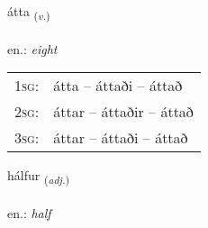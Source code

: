 \documentclass[frontgrid, backgrid]{flacards}\usepackage[]{graphicx}\usepackage[]{xcolor}
\begin{document}
\renewcommand{\flhead}{\vskip5pt \fboxsep=0pt {\small\bfseries\footnotesize Sagnorð | Verb}}
\renewcommand{\fcfoot}{\vskip5pt \fboxsep=0pt \hspace{2pt}{\small\bfseries\footnotesize 1K}}

\renewcommand{\blhead}{\vskip5pt {\small\bfseries\footnotesize Sagnorð | Verb }}
\renewcommand{\bcfoot}{\vskip5pt \hspace{2pt}{\small\bfseries\footnotesize 1K}}


{átta \small{\textsubscript{(\textit{v.})}} \\[1ex] %
\textphonetic{[auhta]} \\
en.: \emph{eight} \\  [2ex]
\renewcommand*{\arraystretch}{0.8}
\begin{tabular}{p{1cm}l}
\textsc{1sg}: & átta -- áttaði -- áttað \\ 
\textsc{2sg}: & áttar -- áttaðir -- áttað \\ 
\textsc{3sg}: & áttar -- áttaði -- áttað \\ 
\end{tabular}
}

\renewcommand{\flhead}{\vskip5pt \fboxsep=0pt {\small\bfseries\footnotesize Lýsingarorð | Adjective}}
\renewcommand{\fcfoot}{\vskip5pt \fboxsep=0pt \hspace{2pt}{\small\bfseries\footnotesize 1K}}

\renewcommand{\blhead}{\vskip5pt {\small\bfseries\footnotesize Lýsingarorð | Adjective }}
\renewcommand{\bcfoot}{\vskip5pt \hspace{2pt}{\small\bfseries\footnotesize 1K}}


{hálfur \small{\textsubscript{(\textit{adj.})}} \\[1ex] %
\textphonetic{[haulvʏr]} \\
en.: \emph{half} \\  [2ex]
\renewcommand*{\arraystretch}{0.8}
}
\end{document}
